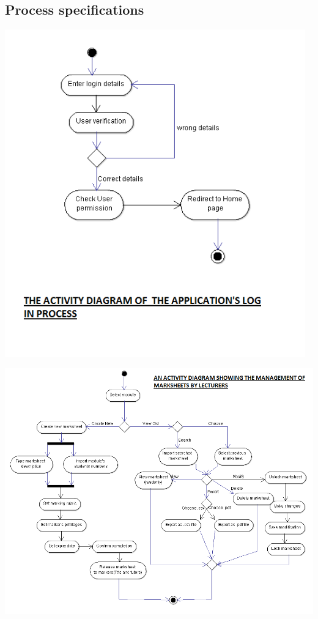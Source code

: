 \documentclass[12pt]{article}
\begin{document}
 \subsection{Process specifications}
  \begin{center}
  \includegraphics[width=130mm]{UserLogin.png}  
  \end{center}
  \begin{center}
  \advance\leftskip-2.8cm
  \includegraphics[width=190mm]{LecturersManagingMarksheets.png}  
  \end{center}
\end{document}
